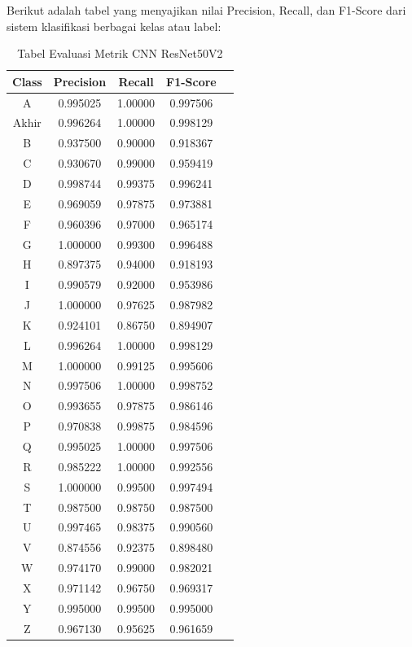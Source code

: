 Berikut adalah tabel yang menyajikan nilai Precision, Recall, dan F1-Score dari sistem klasifikasi berbagai kelas atau label:

\begin{table}[h]
\centering
\caption{Tabel Evaluasi Metrik CNN ResNet50V2}
\begin{tabular}{|c|c|c|c|c|}
\hline
Class & Precision & Recall & F1-Score \\
\hline
A & 0.995025 & 1.00000 & 0.997506 \\
Akhir & 0.996264 & 1.00000 & 0.998129 \\
B & 0.937500 & 0.90000 & 0.918367 \\
C & 0.930670 & 0.99000 & 0.959419 \\
D & 0.998744 & 0.99375 & 0.996241 \\
E & 0.969059 & 0.97875 & 0.973881 \\
F & 0.960396 & 0.97000 & 0.965174 \\
G & 1.000000 & 0.99300 & 0.996488 \\
H & 0.897375 & 0.94000 & 0.918193 \\
I & 0.990579 & 0.92000 & 0.953986 \\
J & 1.000000 & 0.97625 & 0.987982 \\
K & 0.924101 & 0.86750 & 0.894907 \\
L & 0.996264 & 1.00000 & 0.998129 \\
M & 1.000000 & 0.99125 & 0.995606 \\
N & 0.997506 & 1.00000 & 0.998752 \\
O & 0.993655 & 0.97875 & 0.986146 \\
P & 0.970838 & 0.99875 & 0.984596 \\
Q & 0.995025 & 1.00000 & 0.997506 \\
R & 0.985222 & 1.00000 & 0.992556 \\
S & 1.000000 & 0.99500 & 0.997494 \\
T & 0.987500 & 0.98750 & 0.987500 \\
U & 0.997465 & 0.98375 & 0.990560 \\
V & 0.874556 & 0.92375 & 0.898480 \\
W & 0.974170 & 0.99000 & 0.982021 \\
X & 0.971142 & 0.96750 & 0.969317 \\
Y & 0.995000 & 0.99500 & 0.995000 \\
Z & 0.967130 & 0.95625 & 0.961659 \\
\hline
\end{tabular}
\label{tab:tabelevaluasicnnresnet50v2}
\end{table}

